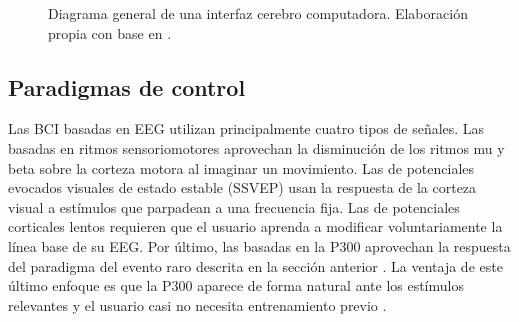 \begin{figure}[htbp]
\centering
{}
\caption{Diagrama general de una interfaz cerebro computadora. Elaboración propia con base en
\cite{wolpaw2002,wolpaw2012}.}
\label{fig:bci}
\end{figure}

\subsection{Paradigmas de control}

Las BCI basadas en EEG utilizan principalmente cuatro tipos de señales. Las basadas en ritmos sensoriomotores aprovechan la
disminución de los ritmos mu y beta sobre la corteza motora al imaginar un movimiento. Las de
potenciales evocados visuales de estado estable (SSVEP) usan la respuesta de la corteza visual a
estímulos que parpadean a una frecuencia fija. Las de potenciales corticales lentos requieren que
el usuario aprenda a modificar voluntariamente la línea base de su EEG. Por último, las basadas en
la P300 aprovechan la respuesta del paradigma del evento raro descrita en la sección anterior
\cite{nicolasalonso2012,wolpaw2002}. La ventaja de este último enfoque es que la P300 aparece de
forma natural ante los estímulos relevantes y el usuario casi no necesita entrenamiento previo \cite{farwell1988,contreras2021}.
